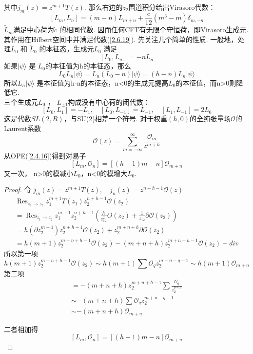 其中$j_{m}(z)=z^{m+1} T(z)$.
那么右边的$z_2$围道积分给出Virasoro代数：
\begin{equation}\label{2.6.19}
\left[L_{m}, L_{n}\right]=(m-n) L_{m+n}+\frac{c}{12}\left(m^{3}-m\right) \delta_{m,-n}
\end{equation}
$\tilde{L}_{m}$满足中心荷为$\tilde{c}$ 的相同代数.
因而任何CFT有无限个守恒荷，即Virasoro生成元. 其作用在Hilbert空间中并满足代数(\ref{2.6.19}). 先关注几个简单的性质. 一般地，处理$L_{0}$ 和 $\tilde{L}_{0}$ 的本征态，生成元$L_{0}$ 满足
\begin{equation}
\left[L_{0}, L_{n}\right]=-n L_{n}
\end{equation}
如果$|\psi\rangle$ 是 $L_{0}$的本征值为h的本征态，那么
\begin{equation}
L_{0} L_{n}|\psi\rangle=L_{n}\left(L_{0}-n\right)|\psi\rangle=(h-n) L_{n}|\psi\rangle
\end{equation}
所以$L_n|\psi\rangle$ 是本征值为h-n的本征态，n<0的生成元提高$L_{0}$的本征值，而n>0则降低它.\\
三个生成元$L_{0}$ ， $L_{\pm 1}$构成没有中心荷的闭代数：
\begin{equation}
\left[L_{0}, L_{1}\right]=-L_{1}, \quad\left[L_{0}, L_{-1}\right]=L_{-1}, \quad\left[L_{1}, L_{-1}\right]=2 L_{0}
\end{equation}
这是代数$SL(2,R)$，与SU(2)相差一个符号. 对于权重$(h,0)$的全纯张量场$\mathcal{O}$的Laurent系数
\begin{equation}
\mathcal{O}(z)=\sum_{m=-\infty}^{\infty} \frac{\mathcal{O}_{m}}{z^{m+h}}
\end{equation}
从OPE(\ref{2.4.16})得到对易子
\begin{equation}
\left[L_{m}, \mathcal{O}_{n}\right]=[(h-1) m-n] \mathcal{O}_{m+n}
\end{equation}
又一次， n>0的模减小$L_0$，n<0的模增大$L_0$.\\
\begin{proof}
令
$j_{m}(z)=z^{m+1} T(z), \quad j_{n}(z)=z^{n+h-1} \mathcal{O}(z)$
$$
\begin{array}{l}
\operatorname{Res}_{z_1 \rightarrow z_2}  z_1^{m+1} T\left(z_{1}\right) z_2^{n+h-1} \mathcal{O}(z_{2})\\
=\operatorname{Res}_{z_1 \rightarrow z_2} z_1^{m+1} z_2^{n+h-1}\left(\frac{h}{z_{12}^2} O(z_2)+\frac{1}{z_{12}} \partial \mathcal{O}(z_2)\right)\\
=h(\partial z_2^{m+1})z_2^{n+h-1}\mathcal{O}(z_2)+z_2^{m+n+h}\partial\mathcal{O}(z_2)\\
=h(m+1)z_2^{m+n+h-1}\mathcal{O}(z_2)-(m+n+h)z_2^{m+n+h-1}\mathcal{O}(z_2)+div
\end{array}
$$
所以第一项
$$h(m+1)z_2^{m+n+h-1}\mathcal{O}(z_2) \sim h(m+1) \sum \mathcal{O}_q z_2^{m+n-q-1} \sim h(m+1)\mathcal{O}_{m+n}$$
第二项
$$
\begin{array}{l}
=-(m+n+h) z_{2}^{m+n+h-1} \sum \frac{\mathcal{O}_{q}}{z_{2}^{q+h}} \\
\sim -(m+n+h) \sum \mathcal{O}_{q} z_{2}^{m+n-q-1} \\
\sim-(m+n+h) \mathcal{O}_{m+n}
\end{array}
$$

二者相加得
$$\left[L_{m}, \mathcal{O}_{n}\right]=[(h-1) m-n] \mathcal{O}_{m+n}$$
\end{proof}

